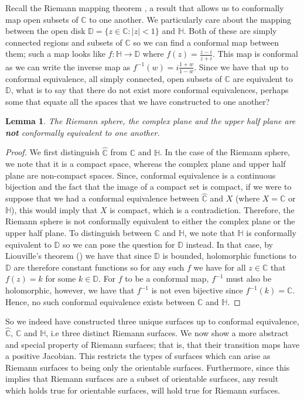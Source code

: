 \documentclass[11pt]{report}
\newtheorem{lemma}[thm]{Lemma}
\theoremstyle{definition}
\begin{document}
Recall the Riemann mapping theorem \cite[p.221]{ahlfors}, a result that allows us to conformally map open subsets of $\mathbb{C}$ to one another. We particularly care about the mapping between the open disk $\mathbb{D}=\{z \in \mathbb{C} \colon |z| < 1\}$ and $\mathbb{H}$. Both of these are simply connected regions and subsets of $\mathbb{C}$ so we can find a conformal map between them; such a map looks like $f:\mathbb{H} \rightarrow \mathbb{D}$ where $f(z) = \frac{z-i}{z+i}$. This map is conformal as we can write the inverse map as $f^{-1}(w) = i\frac{1+w}{1-w}$.
Since we have that up to conformal equivalence, all simply connected, open subsets of $\mathbb{C}$ are equivalent to $\mathbb{D}$, what is to say that there do not exist more conformal equivalences, perhaps some that equate all the spaces that we have constructed to one another? 
\begin{lemma}
  The Riemann sphere, the complex plane and the upper half plane are \textbf{not} conformally equivalent to one another.
\end{lemma}
\begin{proof}
  We first distinguish $\widehat{\mathbb{C}}$ from $\mathbb{C}$ and $\mathbb{H}$. In the case of the Riemann sphere, we note that it is a compact space, whereas the complex plane and upper half plane are non-compact spaces. Since, conformal equivalence is a continuous bijection and the fact that the image of a compact set is compact, if we were to suppose that we had a conformal equivalence between $\widehat{\mathbb{C}}$ and $X$ (where $X = \mathbb{C}$ or $\mathbb{H}$), this would imply that $X$ is compact, which is a contradiction. Therefore, the Riemann sphere is not conformally equivalent to either the complex plane or the upper half plane. 
  To distinguish between $\mathbb{C}$ and $\mathbb{H}$, we note that $\mathbb{H}$ is conformally equivalent to $\mathbb{D}$ so we can pose the question for $\mathbb{D}$ instead. In that case, by Liouville's theorem (\cite[p.122]{ahlfors}) we have that since $\mathbb{D}$ is bounded, holomorphic functions to $\mathbb{D}$ are therefore constant functions so for any such $f$ we have for all $z \in \mathbb{C}$ that $f(z) = k$ for some $k \in \mathbb{D}$. For $f$ to be a conformal map, $f^{-1}$ must also be holomorphic, however, we have that $f^{-1}$ is not even bijective since $f^{-1}(k) = \mathbb{C}$. Hence, no such conformal equivalence exists between $\mathbb{C}$ and $\mathbb{H}$. 
\end{proof}
So we indeed have constructed three unique surfaces up to conformal equivalence, $\widehat{\mathbb{C}}$, $\mathbb{C}$ and $\mathbb{H}$, i.e three distinct Riemann surfaces. We now show a more abstract and special property of Riemann surfaces; that is, that their transition maps have a positive Jacobian. This restricts the types of surfaces which can arise as Riemann surfaces to being only the orientable surfaces. Furthermore, since this implies that Riemann surfaces are a subset of orientable surfaces, any result which holds true for orientable surfaces, will hold true for Riemann surfaces. 
\end{document}
